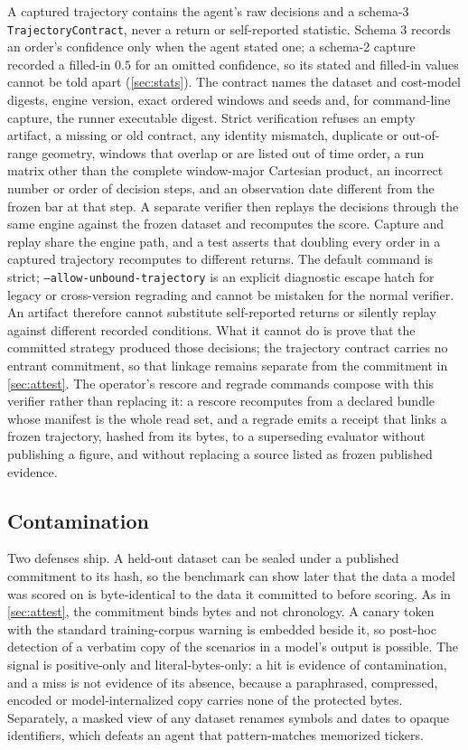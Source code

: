 A captured trajectory contains the agent's raw decisions and a schema-3 \texttt{TrajectoryContract}, never a return or self-reported statistic. Schema 3 records an order's confidence only when the agent stated one; a schema-2 capture recorded a filled-in $0.5$ for an omitted confidence, so its stated and filled-in values cannot be told apart (\cref{sec:stats}). The contract names the dataset and cost-model digests, engine version, exact ordered windows and seeds and, for command-line capture, the runner executable digest. Strict verification refuses an empty artifact, a missing or old contract, any identity mismatch, duplicate or out-of-range geometry, windows that overlap or are listed out of time order, a run matrix other than the complete window-major Cartesian product, an incorrect number or order of decision steps, and an observation date different from the frozen bar at that step. A separate verifier then replays the decisions through the same engine against the frozen dataset and recomputes the score. Capture and replay share the engine path, and a test asserts that doubling every order in a captured trajectory recomputes to different returns. The default command is strict; \texttt{--allow-unbound-trajectory} is an explicit diagnostic escape hatch for legacy or cross-version regrading and cannot be mistaken for the normal verifier. An artifact therefore cannot substitute self-reported returns or silently replay against different recorded conditions. What it cannot do is prove that the committed strategy produced those decisions; the trajectory contract carries no entrant commitment, so that linkage remains separate from the commitment in \cref{sec:attest}. The operator's rescore and regrade commands compose with this verifier rather than replacing it: a rescore recomputes from a declared bundle whose manifest is the whole read set, and a regrade emits a receipt that links a frozen trajectory, hashed from its bytes, to a superseding evaluator without publishing a figure, and without replacing a source listed as frozen published evidence.


\subsection{Contamination}\label{sec:contamination}

Two defenses ship. A held-out dataset can be sealed under a published commitment to its hash, so the benchmark can show later that the data a model was scored on is byte-identical to the data it committed to before scoring. As in \cref{sec:attest}, the commitment binds bytes and not chronology. A canary token with the standard training-corpus warning is embedded beside it, so post-hoc detection of a verbatim copy of the scenarios in a model's output is possible. The signal is positive-only and literal-bytes-only: a hit is evidence of contamination, and a miss is not evidence of its absence, because a paraphrased, compressed, encoded or model-internalized copy carries none of the protected bytes. Separately, a masked view of any dataset renames symbols and dates to opaque identifiers, which defeats an agent that pattern-matches memorized tickers.

